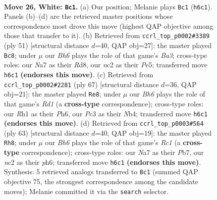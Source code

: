 \documentclass[11pt]{article}
\begin{document}
\clearpage

\begin{figure}[p]\centering
\begin{subfigure}{0.46\textwidth}\centering
\resizebox{\linewidth}{!}{%
\newchessgame
\chessboard[
  setfen={3k4/Nppnpr1p/6pB/p7/7P/2P2P2/P1n1KP2/7R w - - 5 26},
  showmover=false,
  pgfstyle=straightmove, color=movearrow, markmove={h6-c1}
]}
\caption{}
\end{subfigure}\hfill
\begin{subfigure}{0.46\textwidth}\centering
\resizebox{\linewidth}{!}{%
\newchessgame
\chessboard[
  setfen={3r4/5pk1/b1p3p1/P3p2p/4P3/1PN2R2/1KP4P/8 b - - 0 26},
  showmover=false,
  pgfstyle=straightmove, color=movearrow, markmove={a6-c8}
]}
\caption{}
\end{subfigure}
\\[4pt]
\begin{subfigure}{0.46\textwidth}\centering
\resizebox{\linewidth}{!}{%
\newchessgame
\chessboard[
  setfen={3r4/4Np1k/1p3p1p/p7/Pn6/5R1P/1P3PP1/6K1 b - - 1 34},
  showmover=false,
  pgfstyle=straightmove, color=movearrow, markmove={d8-e8}
]}
\caption{}
\end{subfigure}\hfill
\begin{subfigure}{0.46\textwidth}\centering
\resizebox{\linewidth}{!}{%
\newchessgame
\chessboard[
  setfen={2r5/pp2pk2/4p2P/3p4/3N1PnP/PP6/1KP5/3R4 b - - 2 32},
  showmover=false,
  pgfstyle=straightmove, color=movearrow, markmove={c8-h8}
]}
\caption{}
\end{subfigure}
\caption{\textbf{Move 26, White: \texttt{Bc1}.} (a) Our position; Melanie plays \texttt{Bc1} (\texttt{h6c1}). Panels (b)--(d) are the retrieved master positions whose correspondence most drove this move (highest QAP objective among those that transfer to it). (b) Retrieved from \texttt{ccrl\_top\_p0002\#3389} (ply 51) [structural distance $d$=40, QAP obj=27]: the master played \texttt{Bc8}; under $\mu$ our \emph{Bh6} plays the role of that game's \emph{Ba3}; cross-type roles: our \emph{N}a7 as their \emph{R}d8, our \emph{n}c2 as their \emph{P}e5; transferred move \texttt{h6c1} \textbf{(endorses this move)}. (c) Retrieved from \texttt{ccrl\_top\_p0002\#2281} (ply 67) [structural distance $d$=36, QAP obj=21]: the master played \texttt{Re8}; under $\mu$ our \emph{Bh6} plays the role of that game's \emph{Rd1} (a \textbf{cross-type} correspondence); cross-type roles: our \emph{R}h1 as their \emph{P}h6, our \emph{P}c3 as their \emph{N}b4; transferred move \texttt{h6c1} \textbf{(endorses this move)}. (d) Retrieved from \texttt{ccrl\_top\_p0003\#564} (ply 63) [structural distance $d$=40, QAP obj=19]: the master played \texttt{Rh8}; under $\mu$ our \emph{Bh6} plays the role of that game's \emph{Rc1} (a \textbf{cross-type} correspondence); cross-type roles: our \emph{N}a7 as their \emph{P}b7, our \emph{n}c2 as their \emph{p}h6; transferred move \texttt{h6c1} \textbf{(endorses this move)}. Synthesis: 5 retrieved analogs transferred to \texttt{Bc1} (summed QAP objective 75, the strongest correspondence among the candidate moves); Melanie committed it via the \texttt{search} selector.}
\label{fig:thought-m50}
\end{figure}
\end{document}
